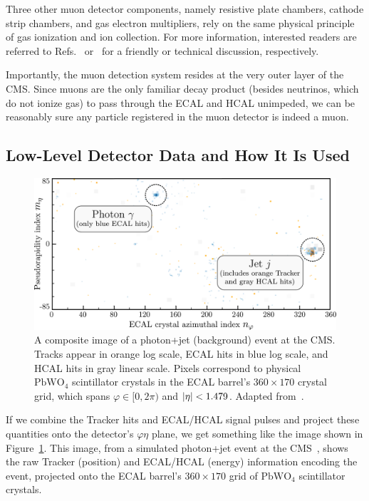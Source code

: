 \documentclass[11pt, a4paper]{article}
\newcommand{\chem}[1]{\ensuremath{\mathrm{#1}}}  %
\begin{document}
Three other muon detector components, namely resistive plate chambers, cathode strip chambers, and gas electron multipliers, rely on the same physical principle of gas ionization and ion collection.
For more information, interested readers are referred to Refs.~\cite{muon-web} or~\cite{muon-tdr} for a friendly or technical discussion, respectively.

Importantly, the muon detection system resides at the very outer layer of the CMS.
Since muons are the only familiar decay product (besides neutrinos, which do not ionize gas) to pass through the ECAL and HCAL unimpeded, we can be reasonably sure any particle registered in the muon detector is indeed a muon.

\subsection{Low-Level Detector Data and How It Is Used} \label{ss:three-methods}

\begin{figure}[htb!]
    \centering
    \includegraphics[width=\linewidth]{raster/raster-svg/event-image.pdf}
    \caption{A composite image of a photon+jet (background) event at the CMS.
    Tracks appear in orange log scale, ECAL hits in blue log scale, and HCAL hits in gray linear scale.
    Pixels correspond to physical \chem{PbWO_4} scintillator crystals in the ECAL barrel's $ 360 \times 170 $ crystal grid, which spans $ \varphi \in [0, 2\pi) $ and $ \abs{\eta} < 1.479$.
    Adapted from~\cite{andrews-higgs}.}
    \label{fig:data-raw-ecal}
\end{figure}

If we combine the Tracker hits and ECAL/HCAL signal pulses and project these quantities onto the detector's $ \varphi \eta $ plane, we get something like the image shown in Figure~\ref{fig:data-raw-ecal}.
This image, from a simulated photon+jet event at the CMS~\cite{data-bg-jet}, shows the raw Tracker (position) and ECAL/HCAL (energy) information encoding the event, projected onto the ECAL barrel's $ 360 \times 170 $ grid of \chem{PbWO_4} scintillator crystals.
\end{document}
